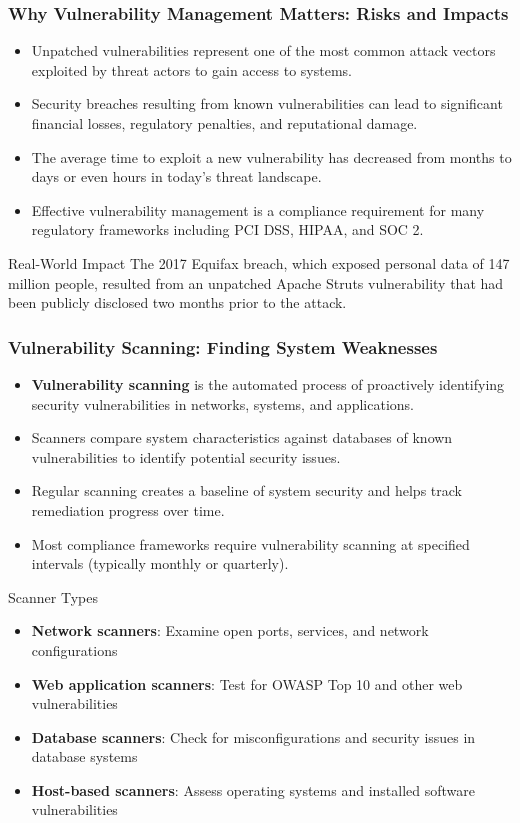 \documentclass{beamer}
\begin{document}
\begin{frame}
\frametitle{Why Vulnerability Management Matters: Risks and Impacts}
\begin{itemize}
\item Unpatched vulnerabilities represent one of the most common attack vectors exploited by threat actors to gain access to systems.
\item Security breaches resulting from known vulnerabilities can lead to significant financial losses, regulatory penalties, and reputational damage.
\item The average time to exploit a new vulnerability has decreased from months to days or even hours in today's threat landscape.
\item Effective vulnerability management is a compliance requirement for many regulatory frameworks including PCI DSS, HIPAA, and SOC 2.
\end{itemize}

\begin{exampleblock}{Real-World Impact}
The 2017 Equifax breach, which exposed personal data of 147 million people, resulted from an unpatched Apache Struts vulnerability that had been publicly disclosed two months prior to the attack.
\end{exampleblock}
\end{frame}

\begin{frame}
\frametitle{Vulnerability Scanning: Finding System Weaknesses}
\begin{itemize}
\item \textbf{Vulnerability scanning} is the automated process of proactively identifying security vulnerabilities in networks, systems, and applications.
\item Scanners compare system characteristics against databases of known vulnerabilities to identify potential security issues.
\item Regular scanning creates a baseline of system security and helps track remediation progress over time.
\item Most compliance frameworks require vulnerability scanning at specified intervals (typically monthly or quarterly).
\end{itemize}

\begin{block}{Scanner Types}
\scriptsize
\begin{itemize}
\item \textbf{Network scanners}: Examine open ports, services, and network configurations
\item \textbf{Web application scanners}: Test for OWASP Top 10 and other web vulnerabilities
\item \textbf{Database scanners}: Check for misconfigurations and security issues in database systems
\item \textbf{Host-based scanners}: Assess operating systems and installed software vulnerabilities
\end{itemize}
\end{block}
\end{frame}
\end{document}
